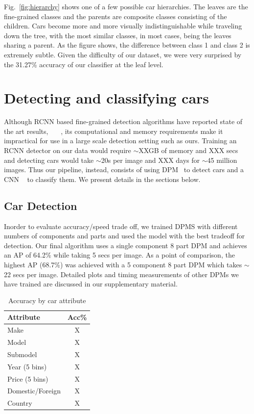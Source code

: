 \documentclass[10pt,twocolumn,letterpaper]{article}
\begin{document}
Fig.~\ref{fig:hierarchy} shows one of a few possible car hierarchies. The leaves are the fine-grained classes and the parents are composite classes consisting of the children. Cars become more and more visually indistinguishable while traveling down the tree, with the most similar classes, in most cases, being the leaves sharing a parent. As the figure shows, the difference between class 1 and class 2 is extremely subtle. Given the difficulty of our dataset, we were very surprised by the 31.27\% accuracy of our classifier at the leaf level. 

\section{Detecting and classifying cars}
\label{sec:detection}
Although RCNN based fine-grained detection algorithms have reported state of the art results, ~\cite{rcnn}~\cite{ning}~\cite{branson}, its computational and memory requirements make it impractical for use in a large scale detection setting such as ours. Training an RCNN detector on our data would require \(\sim\)XXGB of memory and XXX secs and detecting cars  would take \(\sim\)20s per image and XXX days for \(\sim\)45 million images. Thus our pipeline, instead, consists of using DPM~\cite{dpm} to detect cars and a CNN ~\cite{alexnet} to classify them. We present details in the sections below.

\subsection{Car Detection}
Inorder to evaluate accuracy/speed trade off, we trained DPMS with different numbers of components and parts and used the model with the best tradeoff for detection. Our final algorithm uses a single component 8 part DPM and achieves an AP of 64.2\% while taking 5 secs per image. As a point of comparison, the highest AP (68.7\%) was achieved with a 5 component 8 part DPM which takes \(\sim\)22 secs per image. Detailed plots and timing measurements of other DPMs we have trained are discussed in our supplementary material.


\begin{table}
\begin{center}
\begin{tabular}{|l|c|}
\hline
\textbf{Attribute} & \textbf{Acc\%} \\
\hline\hline
Make & X \\
Model & X \\
Submodel & X \\
Year (5 bins) & X \\
Price (5 bins)& X \\
Domestic/Foreign & X\\
Country & X\\
\hline
\end{tabular}
\end{center}
\caption{Accuracy by car attribute}
\label{table:tree-acc}
\end{table}
\end{document}
